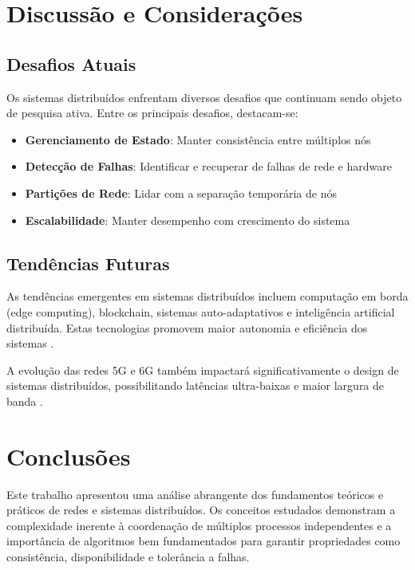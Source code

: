 \section{Discussão e Considerações}

\subsection{Desafios Atuais}

Os sistemas distribuídos enfrentam diversos desafios que continuam sendo objeto de pesquisa ativa. Entre os principais desafios, destacam-se:

\begin{itemize}
    \item \textbf{Gerenciamento de Estado}: Manter consistência entre múltiplos nós
    \item \textbf{Detecção de Falhas}: Identificar e recuperar de falhas de rede e hardware
    \item \textbf{Partições de Rede}: Lidar com a separação temporária de nós
    \item \textbf{Escalabilidade}: Manter desempenho com crescimento do sistema
\end{itemize}

\subsection{Tendências Futuras}

As tendências emergentes em sistemas distribuídos incluem computação em borda (edge computing), blockchain, sistemas auto-adaptativos e inteligência artificial distribuída. Estas tecnologias promovem maior autonomia e eficiência dos sistemas \cite{coulouris2013sistemas}.

A evolução das redes 5G e 6G também impactará significativamente o design de sistemas distribuídos, possibilitando latências ultra-baixas e maior largura de banda \cite{cisco2019networking}.

\section{Conclusões}

Este trabalho apresentou uma análise abrangente dos fundamentos teóricos e práticos de redes e sistemas distribuídos. Os conceitos estudados demonstram a complexidade inerente à coordenação de múltiplos processos independentes e a importância de algoritmos bem fundamentados para garantir propriedades como consistência, disponibilidade e tolerância a falhas.

